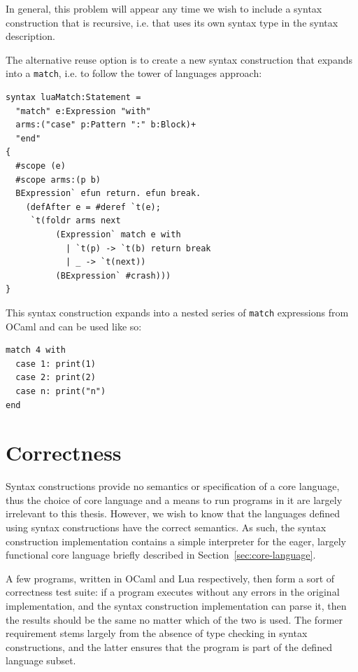 \documentclass{kththesis}
\begin{document}
In general, this problem will appear any time we wish to include a syntax construction that is recursive, i.e. that uses its own syntax type in the syntax description. %

The alternative reuse option is to create a new syntax construction that expands into a \texttt{match}, i.e. to follow the tower of languages approach:

\begin{verbatim}
syntax luaMatch:Statement =
  "match" e:Expression "with"
  arms:("case" p:Pattern ":" b:Block)+
  "end"
{
  #scope (e)
  #scope arms:(p b)
  BExpression` efun return. efun break.
    (defAfter e = #deref `t(e);
     `t(foldr arms next
          (Expression` match e with
            | `t(p) -> `t(b) return break
            | _ -> `t(next))
          (BExpression` #crash)))
}
\end{verbatim}

This syntax construction expands into a nested series of \texttt{match} expressions from OCaml and can be used like so:

\begin{verbatim}
match 4 with
  case 1: print(1)
  case 2: print(2)
  case n: print("n")
end
\end{verbatim}

\section{Correctness} \label{sec:correctness-and-performance}

Syntax constructions provide no semantics or specification of a core language, thus the choice of core language and a means to run programs in it are largely irrelevant to this thesis. However, we wish to know that the languages defined using syntax constructions have the correct semantics. As such, the syntax construction implementation contains a simple interpreter for the eager, largely functional core language briefly described in Section~\ref{sec:core-language}.

A few programs, written in OCaml and Lua respectively, then form a sort of correctness test suite: if a program executes without any errors in the original implementation, and the syntax construction implementation can parse it, then the results should be the same no matter which of the two is used. The former requirement stems largely from the absence of type checking in syntax constructions, and the latter ensures that the program is part of the defined language subset.
\end{document}
